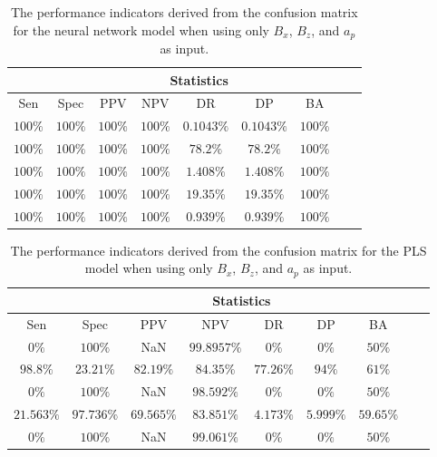 \begin{table}[!ht]
	\centering
	\begin{tabular}{|c|c|c|c|c|c|c|c|c|}
		\hline
		 & \multicolumn{7}{c|}{Statistics} \\ \hline
		Sen & Spec & PPV & NPV & DR & DP & BA \\ \hline
		$100\%$ & $100\%$ & $100\%$ & $100\%$ & $0.1043\%$ & $0.1043\%$ & $100\%$ \\ \hline
		$100\%$ & $100\%$ & $100\%$ & $100\%$ & $78.2\%$ & $78.2\%$ & $100\%$ \\ \hline
		$100\%$ & $100\%$ & $100\%$ & $100\%$ & $1.408\%$ & $1.408\%$ & $100\%$ \\ \hline
		$100\%$ & $100\%$ & $100\%$ & $100\%$ & $19.35\%$ & $19.35\%$ & $100\%$ \\ \hline
		$100\%$ & $100\%$ & $100\%$ & $100\%$ & $0.939\%$ & $0.939\%$ & $100\%$ \\ \hline
	\end{tabular}
	\caption{The performance indicators derived from the confusion matrix for the neural network model when using only $B_{x}$, $B_{z}$, and $a_{p}$ as input.}
	\label{tab:cs:xzap:nnet}
\end{table}

\begin{table}[!ht]
	\centering
	\begin{tabular}{|c|c|c|c|c|c|c|c|c|}
		\hline
		 & \multicolumn{7}{c|}{Statistics} \\ \hline
		Sen & Spec & PPV & NPV & DR & DP & BA \\ \hline
		$0\%$ & $100\%$ & NaN & $99.8957\%$ & $0\%$ & $0\%$ & $50\%$ \\ \hline
		$98.8\%$ & $23.21\%$ & $82.19\%$ & $84.35\%$ & $77.26\%$ & $94\%$ & $61\%$ \\ \hline
		$0\%$ & $100\%$ & NaN & $98.592\%$ & $0\%$ & $0\%$ & $50\%$ \\ \hline
		$21.563\%$ & $97.736\%$ & $69.565\%$ & $83.851\%$ & $4.173\%$ & $5.999\%$ & $59.65\%$ \\ \hline
		$0\%$ & $100\%$ & NaN & $99.061\%$ & $0\%$ & $0\%$ & $50\%$ \\ \hline
	\end{tabular}
	\caption{The performance indicators derived from the confusion matrix for the PLS model when using only $B_{x}$, $B_{z}$, and $a_{p}$ as input.}
	\label{tab:cs:xzap:pls}
\end{table}

